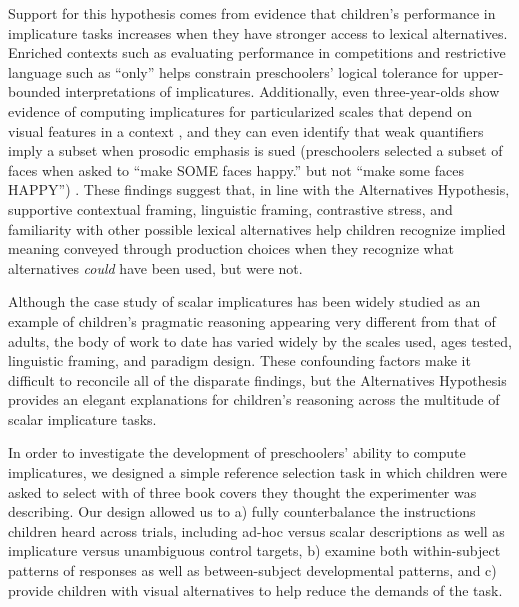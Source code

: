 \documentclass[10pt,letterpaper]{article}
\begin{document}
Support for this hypothesis comes from evidence that children's performance in implicature tasks increases when they have stronger access to lexical alternatives.  Enriched contexts such as evaluating performance in competitions \citep{papafragou2003} and restrictive language such as ``only'' helps constrain preschoolers' logical tolerance for upper-bounded interpretations \citep{barner2011} of implicatures. Additionally, even three-year-olds show evidence of computing implicatures for particularized scales that depend on visual features in a context \citep{stiller2014}, and they can even identify that weak quantifiers imply a subset when prosodic emphasis is sued (preschoolers selected a subset of faces when asked to ``make SOME faces happy.'' but not ``make some faces HAPPY'') \citep{miller2005}. These findings suggest that, in line with the Alternatives Hypothesis, supportive contextual framing, linguistic framing, contrastive stress, and familiarity with other possible lexical alternatives help children recognize implied meaning conveyed through production choices when they recognize what alternatives \emph{could} have been used, but were not. 

Although the case study of scalar implicatures has been widely studied as an example of children's pragmatic reasoning appearing very different from that of adults, the body of work to date has varied widely by the scales used, ages tested, linguistic framing, and paradigm design.  These confounding factors make it difficult to reconcile all of the disparate findings, but the Alternatives Hypothesis provides an elegant explanations for children's reasoning across the multitude of scalar implicature tasks.  

In order to investigate the development of preschoolers' ability to compute implicatures, we designed a simple reference selection task in which children were asked to select with of three book covers they thought the experimenter was describing. Our design allowed us to a) fully counterbalance the instructions children heard across trials, including ad-hoc versus scalar descriptions as well as implicature versus unambiguous control targets, b) examine both within-subject patterns of responses as well as between-subject developmental patterns, and c) provide children with visual alternatives to help reduce the demands of the task.
\end{document}
